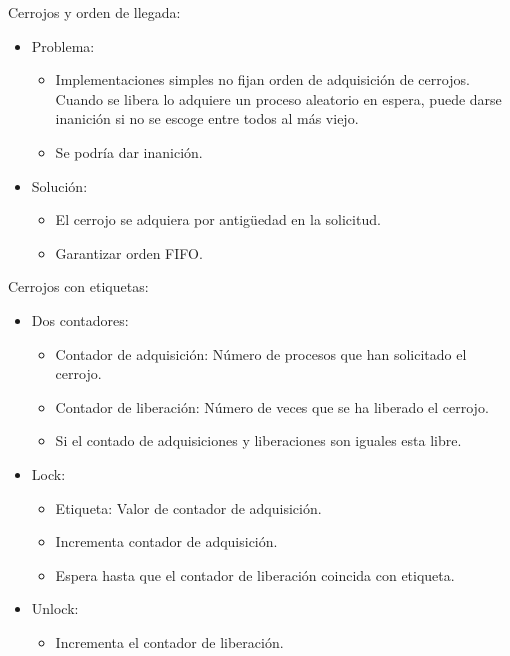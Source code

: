 \documentclass[12pt, twoside, openright]{report} %
\begin{document}
Cerrojos y orden de llegada:

\begin{itemize}

	\item Problema:

	      \begin{itemize}

		      \item Implementaciones simples no fijan orden de adquisición de
		            cerrojos. Cuando se libera lo adquiere un proceso aleatorio en
		            espera, puede darse inanición si no se escoge entre todos al
		            más viejo.
		      \item Se podría dar inanición.
	      \end{itemize}
	\item Solución:

	      \begin{itemize}

		      \item El cerrojo se adquiera por antigüedad en la solicitud.
		      \item Garantizar orden FIFO.
	      \end{itemize}
\end{itemize}
\pagebreak
Cerrojos con etiquetas:

\begin{itemize}

	\item Dos contadores:

	      \begin{itemize}

		      \item Contador de adquisición: Número de procesos que han solicitado
		            el cerrojo.
		      \item Contador de liberación: Número de veces que se ha liberado el
		            cerrojo.
		      \item Si el contado de adquisiciones y liberaciones son iguales esta
		            libre.
	      \end{itemize}
	\item Lock:

	      \begin{itemize}

		      \item Etiqueta: Valor de contador de adquisición.
		      \item Incrementa contador de adquisición.
		      \item Espera hasta que el contador de liberación coincida con
		            etiqueta.
	      \end{itemize}
	\item Unlock:

	      \begin{itemize}

		      \item Incrementa el contador de liberación.
	      \end{itemize}
\end{itemize}
\end{document}
